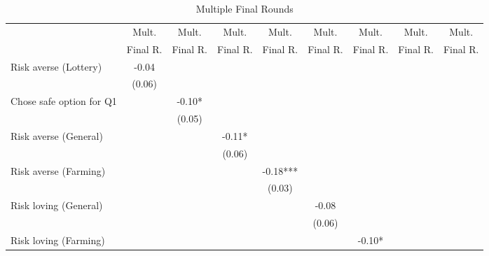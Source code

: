 \begin{table}[htbp]
\centering
\hspace*{-1.2cm}
\begin{threeparttable}
\small
\caption{Multiple Final Rounds}
\label{tab:D3}
\begin{tabular}{l cccccccc}
\hline
\hline
& Mult. & Mult. & Mult. & Mult. & Mult. & Mult. & Mult. & Mult.  \\
& Final R. & Final R. & Final R. & Final R. & Final R. & Final R. & Final R. & Final R.  \\ \hline
Risk averse (Lottery)&       -0.04   &               &               &               &               &               &               &               \\
                    &      (0.06)   &               &               &               &               &               &               &               \\
Chose safe option for Q1&               &       -0.10*  &               &               &               &               &               &               \\
                    &               &      (0.05)   &               &               &               &               &               &               \\
Risk averse (General)&               &               &       -0.11*  &               &               &               &               &               \\
                    &               &               &      (0.06)   &               &               &               &               &               \\
Risk averse (Farming)&               &               &               &       -0.18***&               &               &               &               \\
                    &               &               &               &      (0.03)   &               &               &               &               \\
Risk loving (General)&               &               &               &               &       -0.08   &               &               &               \\
                    &               &               &               &               &      (0.06)   &               &               &               \\
Risk loving (Farming)&               &               &               &               &               &       -0.10*  &               &               \\

\end{tabular}
\end{threeparttable}
\end{table}
